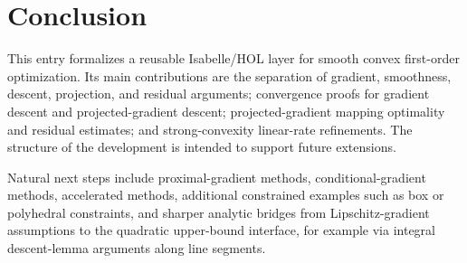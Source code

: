 \documentclass[11pt,a4paper]{article}
\begin{document}
\section{Conclusion}

This entry formalizes a reusable Isabelle/HOL layer for smooth convex first-order optimization.
Its main contributions are the separation of gradient, smoothness, descent, projection, and residual arguments; convergence proofs for gradient descent and projected-gradient descent; projected-gradient mapping optimality and residual estimates; and strong-convexity linear-rate refinements.
The structure of the development is intended to support future extensions.

Natural next steps include proximal-gradient methods, conditional-gradient methods, accelerated methods, additional constrained examples such as box or polyhedral constraints, and sharper analytic bridges from Lipschitz-gradient assumptions to the quadratic upper-bound interface, for example via integral descent-lemma arguments along line segments.





\end{document}
